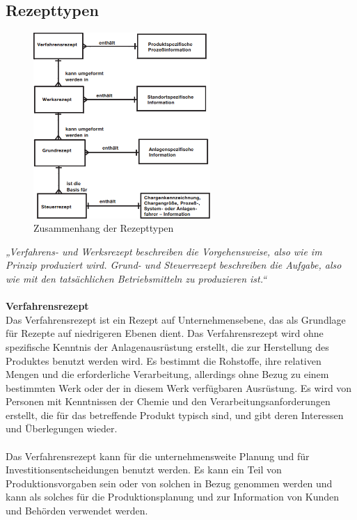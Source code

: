 \subsection{Rezepttypen}
\begin{figure}[h!]
		\centering
		\includegraphics[width=0.6\textwidth]{graphics/stateoftheart/rezepttypen.png}
		\caption{Zusammenhang der Rezepttypen \cite{en61512}}
\end{figure}
\textit{„Verfahrens- und Werksrezept beschreiben die Vorgehensweise, also wie im Prinzip produziert wird. Grund- und Steuerrezept beschreiben die Aufgabe, also wie mit den tatsächlichen Betriebsmitteln zu produzieren ist.“} \cite{en61512}
\\\\
\textbf{Verfahrensrezept}\\
Das Verfahrensrezept ist ein Rezept auf Unternehmensebene, das als Grundlage für Rezepte auf niedrigeren Ebenen dient. Das Verfahrensrezept wird ohne spezifische Kenntnis der Anlagenausrüstung erstellt, die zur Herstellung des Produktes benutzt werden wird. Es bestimmt die Rohstoffe, ihre relativen Mengen und die erforderliche Verarbeitung, allerdings ohne Bezug zu einem bestimmten Werk oder der in diesem Werk verfügbaren Ausrüstung. Es wird von Personen mit Kenntnissen der Chemie und den Verarbeitungsanforderungen erstellt, die für das betreffende Produkt typisch sind, und gibt deren Interessen und Überlegungen wieder.\\\\
Das Verfahrensrezept kann für die unternehmensweite Planung und für Investitionsentscheidungen benutzt werden. Es kann ein Teil von Produktionsvorgaben sein oder von solchen in Bezug genommen werden und kann als solches für die Produktionsplanung und zur Information von Kunden und Behörden verwendet werden.
